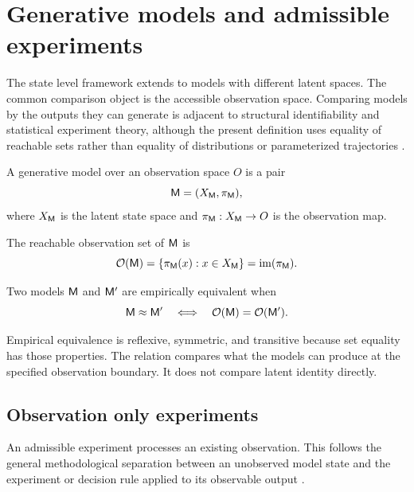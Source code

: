 \section{Generative models and admissible experiments}
\label{sec:models}

The state level framework extends to models with different latent spaces. The common comparison object is the accessible observation space. Comparing models by the outputs they can generate is adjacent to structural identifiability and statistical experiment theory, although the present definition uses equality of reachable sets rather than equality of distributions or parameterized trajectories \parencite{Rothenberg1971,WalterPronzato1997,Blackwell1951,Torgersen1991}.

\begin{definition}
A generative model over an observation space \(O\) is a pair
\[
\mathsf M=(X_\mathsf M,\pi_\mathsf M),
\]
where \(X_\mathsf M\) is the latent state space and \(\pi_\mathsf M:X_\mathsf M\to O\) is the observation map.
\end{definition}
\begin{definition}
The reachable observation set of \(\mathsf M\) is
\[
\mathcal O(\mathsf M)
=
\{\pi_\mathsf M(x):x\in X_\mathsf M\}
=
\operatorname{im}(\pi_\mathsf M).
\]
\end{definition}
\begin{definition}
Two models \(\mathsf M\) and \(\mathsf M'\) are empirically equivalent when
\[
\mathsf M\approx\mathsf M'
\quad\Longleftrightarrow\quad
\mathcal O(\mathsf M)=\mathcal O(\mathsf M').
\]
\end{definition}
Empirical equivalence is reflexive, symmetric, and transitive because set equality has those properties. The relation compares what the models can produce at the specified observation boundary. It does not compare latent identity directly.

\subsection{Observation only experiments}

An admissible experiment processes an existing observation. This follows the general methodological separation between an unobserved model state and the experiment or decision rule applied to its observable output \parencite{Blackwell1953,LeCam1986,LeCamYang2000}.


